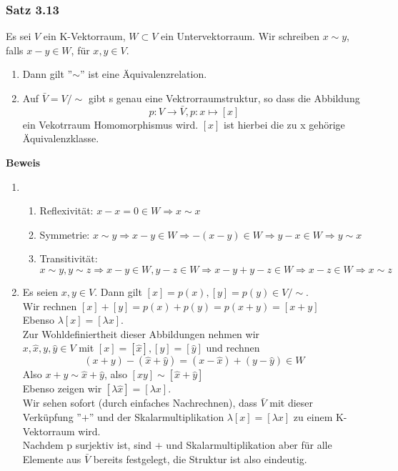 \documentclass{scrartcl}
\newcommand{\lb}{\lambda}
\begin{document}
\subsubsection{Satz 3.13}
Es sei \(V\) ein K-Vektorraum, \(W \subset V\) ein Untervektorraum. Wir schreiben \(x \sim y\), falls \(x - y \in W\), f\"ur \(x, y \in V\).
\begin{enumerate}
  \item{
    Dann gilt ''\(\sim\)'' ist eine \"Aquivalenzrelation.
  }
  \item{
    Auf \(\bar{V} = V/\sim\) gibt s genau eine Vektrorraumstruktur, so dass die Abbildung
    \[p : V \to \bar{V}, p : x \mapsto [x]\]
    ein Vekotrraum Homomorphismus wird.
    \([x]\) ist hierbei die zu x geh\"orige \"Aquivalenzklasse.
  }
\end{enumerate}
\textbf{Beweis}
\begin{enumerate}
  \item{
    \begin{enumerate}
    \item{
      Reflexivit\"at: \(x - x = 0 \in W \Rightarrow x \sim x\)
    }
    \item{
      Symmetrie: \(x \sim y \Rightarrow x - y \in W \Rightarrow -(x - y) \in W \Rightarrow y - x \in W \Rightarrow y \sim x\)
    }
    \item{
      Transitivit\"at: \(x \sim y, y \sim z \Rightarrow x - y \in W, y - z \in W \Rightarrow x-y + y - z \in W \Rightarrow x - z \in W \Rightarrow x \sim z\)
    }
    \end{enumerate}
  }
  \item{
    Es seien \(x, y \in V\). Dann gilt \([x] = p(x), [y] = p(y) \in V/\sim\).\\
    Wir rechnen  \([x] + [y] = p(x) + p(y) = p(x+y) = [x + y]\)\\
    Ebenso \(\lb[x] = [\lb x]\).\\
    Zur Wohldefiniertheit dieser Abbildungen nehmen wir\\
    \(x, \hat{x}, y, \hat{y} \in V\) mit \([x] = [\hat{x}], [y] = [\hat{y}]\) und rechnen
    \[(x + y) - (\hat{x} + \hat{y}) = (x - \hat{x}) + (y - \hat{y}) \in W\]
    Also \(x + y \sim \hat{x} + \hat{y}\), also \([x  y] \sim [\hat{x} + \hat{y}]\)\\
    Ebenso zeigen wir \([\lb \hat{x}] = [\lb x]\).\\
    Wir sehen sofort (durch einfaches Nachrechnen), dass \(\bar{V}\) mit dieser Verk\"upfung ''\(+\)'' und der Skalarmultiplikation \(\lb[x] = [\lb x]\) zu einem K-Vektorraum wird.\\
    Nachdem p surjektiv ist, sind \(+\) und Skalarmultiplikation aber f\"ur alle Elemente aus \(\bar{V}\) bereits festgelegt, die Struktur ist also eindeutig.
  }
\end{enumerate}
\end{document}

